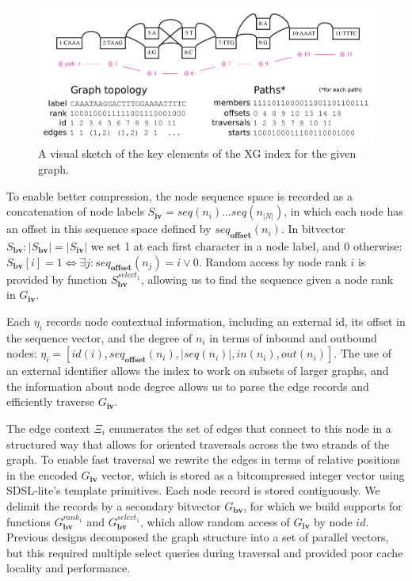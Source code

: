 \begin{figure}[htbp!]
  \includegraphics[width=\textwidth]{Chapter2/Figs/xg_index_sketch.pdf}
  \caption[A visual sketch of the XG index]{
    A visual sketch of the key elements of the XG index for the given graph.
  }
  \label{fig:xg_index}
\end{figure}

To enable better compression, the node sequence space is recorded as a concatenation of node labels $S_\textbf{iv} = seq(n_i) \ldots seq(n_{|N|})$, in which each node has an offset in this sequence space defined by $seq_\textbf{offset}(n_i)$.
In bitvector $S_\textbf{bv} : |S_\textbf{bv}| = |S_\textbf{iv}|$ we set 1 at each first character in a node label, and 0 otherwise: $S_\textbf{bv}[i] = 1 \iff \exists j : seq_\textbf{offset}(n_j) = i \lor 0$.
Random access by node rank $i$ is provided by function $S_\textbf{bv}^{select_1}$, allowing us to find the sequence given a node rank in $G_\textbf{iv}$.

Each $\eta_i$ records node contextual information, including an external id, its offset in the sequence vector, and the degree of $n_i$ in terms of inbound and outbound nodes: $\eta_i = \left[ id(i), seq_\textbf{offset}(n_i), |seq(n_i)|, in(n_i), out(n_i) \right]$.
The use of an external identifier allows the index to work on subsets of larger graphs, and the information about node degree allows us to parse the edge records and efficiently traverse $G_\textbf{iv}$.

The edge context $\Xi_i$ enumerates the set of edges that connect to this node in a structured way that allows for oriented traversals across the two strands of the graph.
To enable fast traversal we rewrite the edges in terms of relative positions in the encoded $G_\textbf{iv}$ vector, which is stored as a bitcompressed integer vector using SDSL-lite's template primitives.
Each node record is stored contiguously.
We delimit the records by a secondary bitvector $G_\textbf{bv}$, for which we build supports for functions $G_\textbf{bv}^{rank_1}$ and $G_\textbf{bv}^{select_1}$, which allow random access of $G_\textbf{iv}$ by node $id$.
Previous designs decomposed the graph structure into a set of parallel vectors, but this required multiple select queries during traversal and provided poor cache locality and performance.

